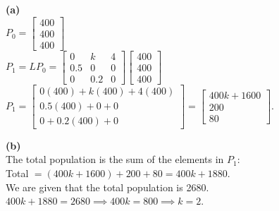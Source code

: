 \begin{solution}
\textbf{(a)} \\
$P_0 = \begin{bmatrix} 400 \\ 400 \\ 400 \end{bmatrix}$ \\
$P_1 = L P_0 = \begin{bmatrix} 0 & k & 4 \\ 0.5 & 0 & 0 \\ 0 & 0.2 & 0 \end{bmatrix} \begin{bmatrix} 400 \\ 400 \\ 400 \end{bmatrix}$ \\
$P_1 = \begin{bmatrix} 0(400) + k(400) + 4(400) \\ 0.5(400) + 0 + 0 \\ 0 + 0.2(400) + 0 \end{bmatrix} = \begin{bmatrix} 400k + 1600 \\ 200 \\ 80 \end{bmatrix}$.

\medskip
\textbf{(b)} \\
The total population is the sum of the elements in $P_1$: \\
Total $= (400k + 1600) + 200 + 80 = 400k + 1880$. \\
We are given that the total population is 2680. \\
$400k + 1880 = 2680 \implies 400k = 800 \implies k = 2$.


\end{solution}
